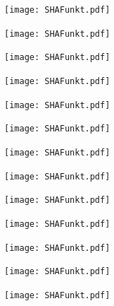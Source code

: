 \documentclass[
  10pt,
  ignorenonframetext,
  aspectratio=43,
]{beamer}
\begin{document}
\begin{frame}{}
\protect\hypertarget{section-4}{}
\texttt{[image: SHAFunkt.pdf]}
\end{frame}

\begin{frame}{}
\protect\hypertarget{section-5}{}
\texttt{[image: SHAFunkt.pdf]}
\end{frame}

\begin{frame}{}
\protect\hypertarget{section-6}{}
\texttt{[image: SHAFunkt.pdf]}
\end{frame}

\begin{frame}{}
\protect\hypertarget{section-7}{}
\texttt{[image: SHAFunkt.pdf]}
\end{frame}

\begin{frame}{}
\protect\hypertarget{section-8}{}
\texttt{[image: SHAFunkt.pdf]}
\end{frame}

\begin{frame}{}
\protect\hypertarget{section-9}{}
\texttt{[image: SHAFunkt.pdf]}
\end{frame}

\begin{frame}{}
\protect\hypertarget{section-10}{}
\texttt{[image: SHAFunkt.pdf]}
\end{frame}

\begin{frame}{}
\protect\hypertarget{section-11}{}
\texttt{[image: SHAFunkt.pdf]}
\end{frame}

\begin{frame}{}
\protect\hypertarget{section-12}{}
\texttt{[image: SHAFunkt.pdf]}
\end{frame}

\begin{frame}{}
\protect\hypertarget{section-13}{}
\texttt{[image: SHAFunkt.pdf]}
\end{frame}

\begin{frame}{}
\protect\hypertarget{section-14}{}
\texttt{[image: SHAFunkt.pdf]}
\end{frame}

\begin{frame}{}
\protect\hypertarget{section-15}{}
\texttt{[image: SHAFunkt.pdf]}
\end{frame}

\begin{frame}{}
\protect\hypertarget{section-16}{}
\texttt{[image: SHAFunkt.pdf]}
\end{frame}
\end{document}
